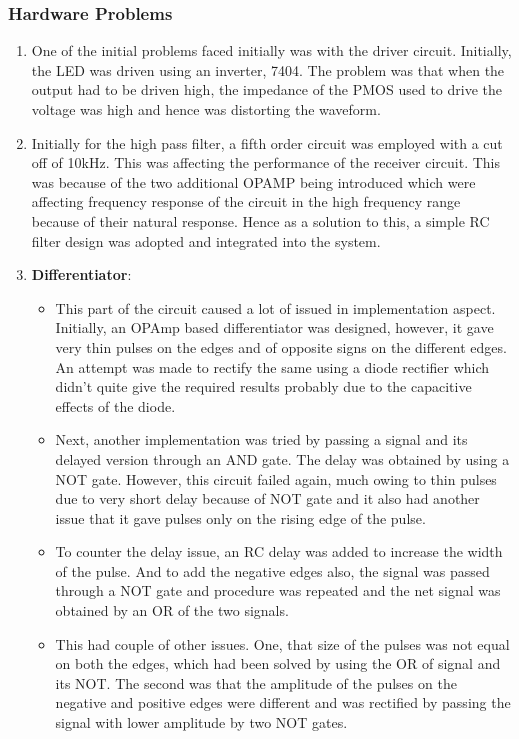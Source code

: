 \documentclass{article}
\begin{document}
\subsubsection{Hardware Problems}
 \begin{enumerate}
\item One of the initial problems faced initially was with the driver circuit. Initially, the LED was driven using an inverter, 7404. The problem was that when the output had to be driven high, the impedance of the PMOS used to drive the voltage was high and hence was distorting the waveform.
\item Initially for the high pass filter, a fifth order circuit was employed with a cut off of 10kHz. This was affecting the performance of the receiver circuit. This was because of the two additional OPAMP being introduced which were affecting frequency response of the circuit in the high frequency range because of their natural response. Hence as a solution to this, a simple RC filter design was adopted and integrated into the system.
\item \textbf{Differentiator}:
  \begin{itemize}
  \item This part of the circuit caused a lot of issued in implementation aspect. Initially, an OPAmp based differentiator was designed, however, it gave very thin pulses on the edges and of opposite signs on the different edges. An attempt was made to rectify the same using a diode rectifier which didn’t quite give the required results probably due to the capacitive effects of the diode.
  \item Next, another implementation was tried by passing a signal and its delayed version through an AND gate. The delay was obtained by using a NOT gate. However, this circuit failed again, much owing to thin pulses due to very short delay because of NOT gate and it also had another issue that it gave pulses only on the rising edge of the pulse.
  \item To counter the delay issue, an RC delay was added to increase the width of the pulse. And to add the negative edges also, the signal was passed through a NOT gate and procedure was repeated and the net signal was obtained by an OR of the two signals.
  \item This had couple of other issues. One, that size of the pulses was not equal on both the edges, which had been solved by using the OR of signal and its NOT. The second was that the amplitude of the pulses on the negative and positive edges were different and was rectified by passing the signal with lower amplitude by two NOT gates.

\end{itemize}
\end{enumerate}
\end{document}
